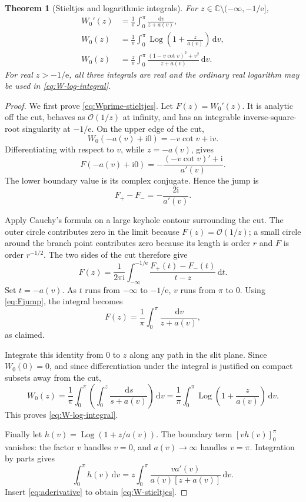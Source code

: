 \documentclass[11pt]{article}
\newtheorem{theorem}{Theorem}[section]
\theoremstyle{remark}
\newcommand{\ee}{\mathrm e}
\newcommand{\ii}{\mathrm i}
\newcommand{\Log}{\operatorname{Log}}
\newcommand{\bigO}{\mathcal O}
\newcommand{\dd}{\,\mathrm d}
\begin{document}
\begin{theorem}[Stieltjes and logarithmic integrals]\label{thm:stieltjes}
For \(z\in\mathbb C\setminus(-\infty,-1/\ee]\),
\begin{align}
 W_0'(z)
 &=\frac1\pi\int_0^\pi\frac{\dd v}{z+a(v)},\label{eq:Wprime-stieltjes}\\
 W_0(z)
 &=\frac1\pi\int_0^\pi
   \Log\left(1+\frac{z}{a(v)}\right)\dd v,\label{eq:W-log-integral}\\
 W_0(z)
 &=\frac{z}{\pi}\int_0^\pi
 \frac{(1-v\cot v)^2+v^2}{z+a(v)}\dd v.
 \label{eq:W-stieltjes}
\end{align}
For real \(z>-1/\ee\), all three integrals are real and the ordinary real
logarithm may be used in \eqref{eq:W-log-integral}.
\end{theorem}

\begin{proof}
We first prove \eqref{eq:Wprime-stieltjes}.  Let
\(F(z)=W_0'(z)\).  It is analytic off the cut, behaves as
\(\bigO(1/z)\) at infinity, and has an integrable inverse-square-root
singularity at \(-1/\ee\).  On the upper edge of the cut,
\[
       W_0(-a(v)+\ii0)=-v\cot v+\ii v.
\]
Differentiating with respect to \(v\), while
\(z=-a(v)\), gives
\[
 F(-a(v)+\ii0)
 =-\frac{(-v\cot v)'+\ii}{a'(v)}.
\]
The lower boundary value is its complex conjugate.  Hence the jump is
\begin{equation}\label{eq:Fjump}
       F_+-F_-=-\frac{2\ii}{a'(v)}.
\end{equation}

Apply Cauchy's formula on a large keyhole contour surrounding the cut.
The outer circle contributes zero in the limit because
\(F(z)=\bigO(1/z)\); a small circle around the branch point contributes zero
because its length is order \(r\) and \(F\) is order \(r^{-1/2}\).
The two sides of the cut therefore give
\[
 F(z)=\frac1{2\pi\ii}
 \int_{-\infty}^{-1/\ee}
 \frac{F_+(t)-F_-(t)}{t-z}\dd t.
\]
Set \(t=-a(v)\).  As \(t\) runs from \(-\infty\) to \(-1/\ee\),
\(v\) runs from \(\pi\) to \(0\).  Using \eqref{eq:Fjump}, the integral
becomes
\[
       F(z)=\frac1\pi\int_0^\pi\frac{\dd v}{z+a(v)},
\]
as claimed.

Integrate this identity from \(0\) to \(z\) along any path in the slit plane.
Since \(W_0(0)=0\), and since differentiation under the integral is justified
on compact subsets away from the cut,
\[
 W_0(z)=\frac1\pi\int_0^\pi
 \left(\int_0^z\frac{\dd s}{s+a(v)}\right)\dd v
 =\frac1\pi\int_0^\pi
 \Log\left(1+\frac{z}{a(v)}\right)\dd v.
\]
This proves \eqref{eq:W-log-integral}.

Finally let
\(h(v)=\Log(1+z/a(v))\).  The boundary term
\([vh(v)]_0^\pi\) vanishes: the factor \(v\) handles \(v=0\), and
\(a(v)\to\infty\) handles \(v=\pi\).  Integration by parts gives
\[
 \int_0^\pi h(v)\dd v
 =z\int_0^\pi\frac{v a'(v)}{a(v)[z+a(v)]}\dd v.
\]
Insert \eqref{eq:aderivative} to obtain \eqref{eq:W-stieltjes}.
\end{proof}
\end{document}
